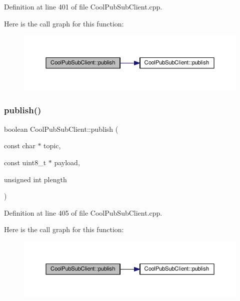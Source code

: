 Definition at line 401 of file Cool\+Pub\+Sub\+Client.\+cpp.

Here is the call graph for this function\+:
\nopagebreak
\begin{figure}[H]
\begin{center}
\leavevmode
\includegraphics[width=350pt]{class_cool_pub_sub_client_a0b01cef98af0b57d8da4df373e196448_cgraph}
\end{center}
\end{figure}
\mbox{\label{class_cool_pub_sub_client_abf184c0968a6655b68b5fdfbbc0c87d1}} 
\subsubsection{\texorpdfstring{publish()}{publish()}\hspace{0.1cm}{\footnotesize\ttfamily [3/4]}}
{\footnotesize\ttfamily boolean Cool\+Pub\+Sub\+Client\+::publish (\begin{DoxyParamCaption}\item[{const char $\ast$}]{topic,  }\item[{const uint8\+\_\+t $\ast$}]{payload,  }\item[{unsigned int}]{plength }\end{DoxyParamCaption})}



Definition at line 405 of file Cool\+Pub\+Sub\+Client.\+cpp.

Here is the call graph for this function\+:
\nopagebreak
\begin{figure}[H]
\begin{center}
\leavevmode
\includegraphics[width=350pt]{class_cool_pub_sub_client_abf184c0968a6655b68b5fdfbbc0c87d1_cgraph}
\end{center}
\end{figure}
\mbox{\label{class_cool_pub_sub_client_adef968760eb87b70e3fed03e60da76f7}} 
